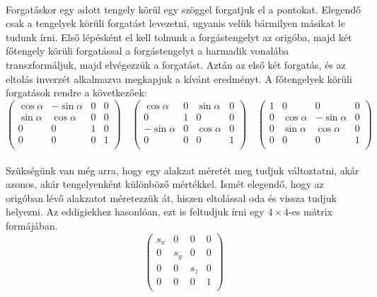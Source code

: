 \documentclass{elteikthesis}
\begin{document}
\paragraph{}
Forgatáskor egy adott tengely körül egy szöggel forgatjuk el a pontokat. Elegendő csak a tengelyek körüli forgatást levezetni, ugyanis velük bármilyen másikat le tudunk írni. Első lépésként el kell tolnunk a forgástengelyt az origóba, majd két főtengely körüli forgatással a forgástengelyt a harmadik vonalába transzformáljuk, majd elvégezzük a forgatást. Aztán az első két forgatás, és az eltolás inverzét alkalmazva megkapjuk a kívánt eredményt. A főtengelyek körüli forgatások rendre a következőek:
$$
\left( \begin{array}{cccc}
	\cos\alpha & -\sin\alpha & 0 & 0 \\
	\sin\alpha & \cos\alpha & 0 & 0 \\
	0 & 0 & 1 & 0 \\
	0 & 0 & 0 & 1 \\
\end{array} \right)
\quad
\left( \begin{array}{cccc}
	\cos\alpha & 0 & \sin\alpha & 0 \\
	0 & 1 & 0 & 0 \\
	-\sin\alpha & 0 & \cos\alpha & 0 \\
	0 & 0 & 0 & 1 \\
\end{array} \right)
\quad
\left( \begin{array}{cccc}
	1 & 0 & 0 & 0 \\
	0 & \cos\alpha & -\sin\alpha & 0 \\
	0 & \sin\alpha & \cos\alpha & 0 \\
	0 & 0 & 0 & 1 \\
\end{array} \right)
$$
\paragraph{}
Szükségünk van még arra, hogy egy alakzat méretét meg tudjuk változtatni, akár azonos, akár tengelyenként különböző mértékkel. Ismét elegendő, hogy az origóban lévő alakzatot méretezzük át, hiszen eltolással oda és vissza tudjuk helyezni.  Az eddigiekhez hasonlóan, ezt is feltudjuk írni egy $4 \times 4$-es mátrix formájában.
$$
\left( \begin{array}{cccc}
	s_x & 0 & 0 & 0 \\
	0 & s_y & 0 & 0 \\
	0 & 0 & s_z & 0 \\
	0 & 0 & 0 & 1 \\
\end{array} \right)
$$
\end{document}
